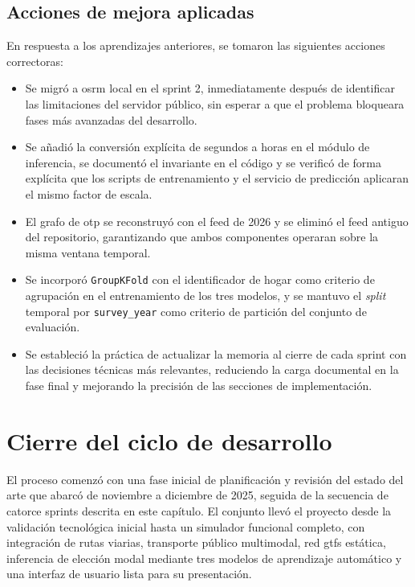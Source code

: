 \subsection{Acciones de mejora aplicadas}

En respuesta a los aprendizajes anteriores, se tomaron las siguientes acciones correctoras:

\begin{itemize}
  \item Se migró a \gls{osrm} local en el sprint 2, inmediatamente después de identificar las limitaciones del servidor público, sin esperar a que el problema bloqueara fases más avanzadas del desarrollo.\newline
  \item Se añadió la conversión explícita de segundos a horas en el módulo de inferencia, se documentó el invariante en el código y se verificó de forma explícita que los scripts de entrenamiento y el servicio de predicción aplicaran el mismo factor de escala.\newline
  \item El grafo de \gls{otp} se reconstruyó con el feed de 2026 y se eliminó el feed antiguo del repositorio, garantizando que ambos componentes operaran sobre la misma ventana temporal.\newline
  \item Se incorporó \texttt{GroupKFold} con el identificador de hogar como criterio de agrupación en el entrenamiento de los tres modelos, y se mantuvo el \textit{split} temporal por \texttt{survey\_year} como criterio de partición del conjunto de evaluación.\newline
  \item Se estableció la práctica de actualizar la memoria al cierre de cada sprint con las decisiones técnicas más relevantes, reduciendo la carga documental en la fase final y mejorando la precisión de las secciones de implementación.\newline
\end{itemize}


\section{Cierre del ciclo de desarrollo}
\label{sec:scrum_cierre}

El proceso comenzó con una fase inicial de planificación y revisión del estado del arte que abarcó de noviembre a diciembre de 2025, seguida de la secuencia de catorce sprints descrita en este capítulo. El conjunto llevó el proyecto desde la validación tecnológica inicial hasta un simulador funcional completo, con integración de rutas viarias, transporte público multimodal, red \gls{gtfs} estática, inferencia de elección modal mediante tres modelos de aprendizaje automático y una interfaz de usuario lista para su presentación.\newline

